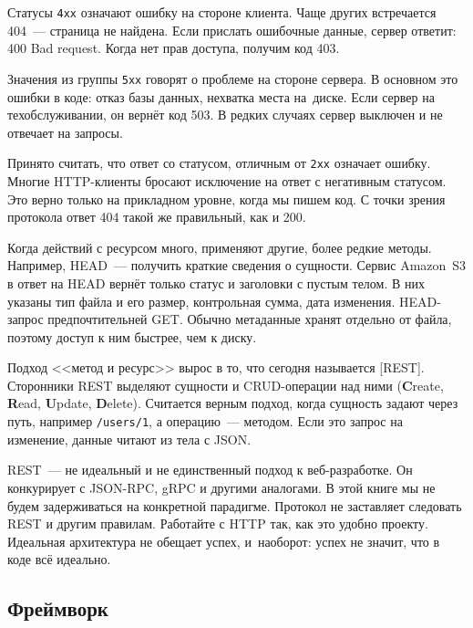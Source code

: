Статусы \verb|4хх| означают ошибку на стороне клиента. Чаще других встречается
404~--- страница не найдена. Если прислать ошибочные данные, сервер ответит: 400
Bad request. Когда нет прав доступа, получим код 403.

Значения из группы \verb|5хх| говорят о проблеме на стороне сервера. В основном
это ошибки в коде: отказ базы данных, нехватка места на~диске. Если сервер на
техобслуживании, он вернёт код 503. В редких случаях сервер выключен и не
отвечает на запросы.

Принято считать, что ответ со статусом, отличным от \verb|2хх| означает
ошибку. Многие HTTP-клиенты бросают исключение на ответ с негативным статусом.
Это верно только на прикладном уровне, когда мы пишем код. С точки зрения
протокола ответ 404 такой же правильный, как и 200.


Когда действий с ресурсом много, применяют другие, более редкие
методы. Например, HEAD~--- получить краткие сведения о сущности. Сервис
Amazon~S3 в ответ на HEAD вернёт только статус и заголовки с пустым телом. В них
указаны тип файла и его размер, контрольная сумма, дата изменения. HEAD-запрос
предпочтительней GET. Обычно метаданные хранят отдельно от файла, поэтому доступ
к ним быстрее, чем к диску.



Подход <<метод и ресурс>> вырос в то, что сегодня называется
[REST]. Сторонники REST выделяют сущности и
CRUD-операции над ними (\textbf{C}reate, \textbf{R}ead, \textbf{U}pdate,
\textbf{D}elete). Считается верным подход, когда сущность задают через путь,
например \verb|/users/1|, а операцию~--- методом. Если это запрос на
изменение, данные читают из тела с JSON.

REST~--- не идеальный и не единственный подход к веб-разработке. Он конкурирует
с JSON-RPC, gRPC и другими аналогами. В этой книге мы не будем задерживаться на
конкретной парадигме. Протокол не заставляет следовать REST и другим
правилам. Работайте с HTTP так, как это удобно проекту. Идеальная архитектура не
обещает успех, и~наоборот: успех не значит, что в коде всё идеально.

\subsection{Фреймворк}


